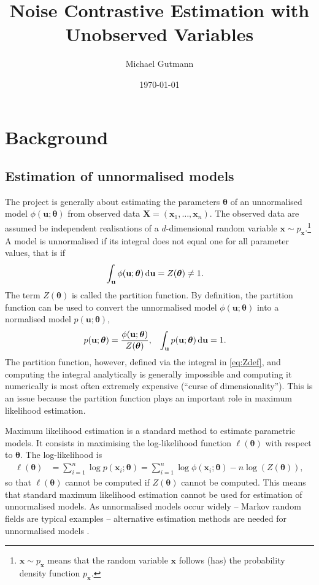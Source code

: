 \documentclass[11pt, oneside]{article}
\title{Noise Contrastive Estimation with Unobserved Variables}
\author{Michael Gutmann}
\date{\today}
\newcommand{\thetab}{{\boldsymbol{\theta}}}
\newcommand{\pnorm}{p}
\newcommand{\pnn}{\phi}
\newcommand{\pdata}{p_{ \mathbf x}}
\renewcommand{\u}{{\mathbf u}}
\newcommand{\x}{{\mathbf x}}
\newcommand{\X}{{\mathbf X}}
\begin{document}
\maketitle

\section{Background}
\subsection{Estimation of unnormalised models}
The project is generally about estimating the parameters $\thetab$ of
an unnormalised model $\pnn(\u ; \thetab)$ from observed data $\X =
(\x_1,\ldots,\x_n)$. The observed data are assumed be independent
realisations of a $d$-dimensional random variable $\x \sim \pdata$.\footnote{$\x \sim \pdata$ means that the
random variable $\x$ follows (has) the probability density function $\pdata$.} A
model is unnormalised if its integral does not equal one for all
parameter values, that is if
 \begin{align}
   \int_{\u }\pnn(\u;\thetab) \dif \u &= Z(\thetab) \neq 1.
\label{eq:Zdef}
  \end{align}
The term $Z(\thetab)$ is called the partition function. By definition,
the partition function can be used to convert the
unnormalised model $\pnn(\u;\thetab)$ into a normalised model
$\pnorm(\u;\thetab)$,
\begin{align}
  \pnorm(\u;\thetab)&=\frac{\pnn(\u;\thetab)}{Z(\thetab)}, & \int_{\u }\pnorm(\u;\thetab) \dif\u & = 1.
\end{align}
The partition function, however, defined via the integral in \eqref{eq:Zdef}, and computing the integral analytically is
generally impossible and computing it numerically is most often
extremely expensive (``curse of dimensionality''). This is an issue because the partition function
plays an important role in maximum likelihood estimation.

Maximum likelihood estimation is a standard method to estimate
parametric models. It consists in maximising the log-likelihood
function $\ell(\thetab)$ with respect to $\thetab$. The log-likelihood
is
\begin{align}
\ell(\thetab) &= \sum_{i=1}^n \log \pnorm(\x_i;\thetab) = \sum_{i=1}^n \log \pnn(\x_i;\thetab) - n \log ( Z(\thetab) ),
\end{align}
so that $\ell(\thetab)$ cannot be computed if $Z(\thetab)$ cannot be
computed. This means that standard maximum likelihood estimation
cannot be used for estimation of unnormalised models. As unnormalised
models occur widely -- Markov random fields are typical examples --
alternative estimation methods are needed for unnormalised models
\citep[see ][for further discussion]{Gutmann2013b}.
\end{document}
